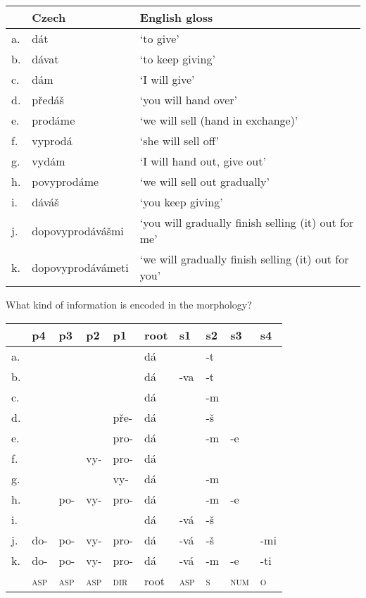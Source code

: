 \documentclass[a4paper,landscape,headrule,footrule]{foils}
\begin{document}
\begin{tabular}{lll}
 & Czech & English gloss\\
 \hline
a. &  dát & `to give'\\
b. & dávat & `to keep giving'\\
c. & dám & `I will give'\\
d. & předáš & `you will hand over'\\
e. & prodáme & `we will sell (hand in exchange)'\\
f. & vyprodá & `she will sell off'\\
g. & vydám & `I will hand out, give out'\\
h. & povyprodáme & `we will sell out gradually'\\
i. & dáváš & `you keep giving'\\
j. & dopovyprodávášmi & `you will gradually finish selling (it) out for me'\\
k. & dopovyprodávámeti & `we will gradually finish selling (it) out for you'\\
\end{tabular}

What kind of information is encoded in the morphology?




\begin{center}%
\begin{tabular}{llllllllll}
    &	p4	& p3		& p2		& p1		& root 	& s1 		& s2	& s3	& s4\\
 \hline
a. &  		&		&		&		& dá		&		& -t & 	&\\
b. & 		&		&		&		& dá		& -va		& -t & 	&\\
c. & 		&		&		&		& dá		&		& -m & 	&\\
d. & 		& 		&		& pře-	& dá 		& 		& -š 	& 	&\\
e. & 		&		&		& pro-	& dá		&		& -m & -e & \\
f. & 		&		& vy- 	& pro-	& dá 		& 		&	&	&\\
g. & 		&		&		& vy- 	& dá		&		& -m & 	&\\
h. & 		& po-	& vy-		& pro-	& dá		& 		& -m & -e & \\
i. & 		&		&		&		& dá 		& -vá 	& -š 	& 	& \\
j. & do- 	& po- 	& vy- 	& pro- 	& dá 		& -vá 	& -š 	& 	& -mi\\
k. & do- 	& po- 	& vy- 	& pro- 	& dá 		& -vá 	& -m	& -e 	& -ti\\
\hline
 & \textsc{asp} 	& \textsc{asp} 	& \textsc{asp} 	& \textsc{dir} 	& root 	& \textsc{asp} 	& \textsc{s}	& \textsc{num} 	& \textsc{o}\\

\end{tabular}
\end{center}
\end{document}
